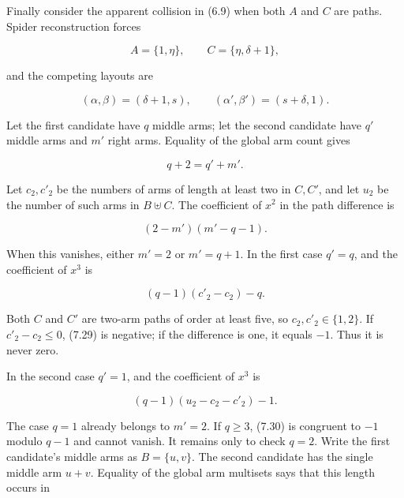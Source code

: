 \documentclass[11pt]{article}
\begin{document}
Finally consider the apparent collision in (6.9) when both $A$ and $C$ are paths. Spider
reconstruction forces

\begin{equation*}
A=\{1,\eta\},\qquad C=\{\eta,\delta+1\},
\tag{7.26}
\end{equation*}


and the competing layouts are

\begin{equation*}
(\alpha,\beta)=(\delta+1,s),\qquad
(\alpha',\beta')=(s+\delta,1).
\tag{7.27}
\end{equation*}


Let the first candidate have $q$ middle arms; let the second candidate have $q'$ middle arms and
$m'$ right arms. Equality of the global arm count gives

\begin{equation*}
q+2=q'+m'.
\end{equation*}


Let $c_2,c'_2$ be the numbers of arms of length at least two in $C,C'$, and let $u_2$ be the
number of such arms in $B\mathbin{\uplus}C$. The coefficient of $x^2$ in the path difference is

\begin{equation*}
(2-m')(m'-q-1).
\tag{7.28}
\end{equation*}


When this vanishes, either $m'=2$ or $m'=q+1$. In the first case $q'=q$, and the coefficient of
$x^3$ is

\begin{equation*}
(q-1)(c'_2-c_2)-q.
\tag{7.29}
\end{equation*}


Both $C$ and $C'$ are two-arm paths of order at least five, so $c_2,c'_2\in\{1,2\}$. If
$c'_2-c_2\leq0$, (7.29) is negative; if the difference is one, it equals $-1$. Thus it is never
zero.

In the second case $q'=1$, and the coefficient of $x^3$ is

\begin{equation*}
(q-1)(u_2-c_2-c'_2)-1.
\tag{7.30}
\end{equation*}


The case $q=1$ already belongs to $m'=2$. If $q\geq3$, (7.30) is congruent to $-1$ modulo
$q-1$ and cannot vanish. It remains only to check $q=2$. Write the first candidate's middle arms as
$B=\{u,v\}$. The second candidate has the single middle arm $u+v$. Equality of the global arm
multisets says that this length occurs in
\end{document}
